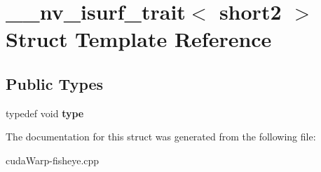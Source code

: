 \hypertarget{struct____nv__isurf__trait_3_01short2_01_4}{}\section{\+\_\+\+\_\+nv\+\_\+isurf\+\_\+trait$<$ short2 $>$ Struct Template Reference}
\label{struct____nv__isurf__trait_3_01short2_01_4}
\subsection*{Public Types}
\begin{DoxyCompactItemize}
\item 
typedef void {\bfseries type}\hypertarget{struct____nv__isurf__trait_3_01short2_01_4_a776ec293f2f6ae6c701753af92e3ce32}{}\label{struct____nv__isurf__trait_3_01short2_01_4_a776ec293f2f6ae6c701753af92e3ce32}

\end{DoxyCompactItemize}


The documentation for this struct was generated from the following file\+:\begin{DoxyCompactItemize}
\item 
cuda\+Warp-\/fisheye.\+cpp\end{DoxyCompactItemize}
